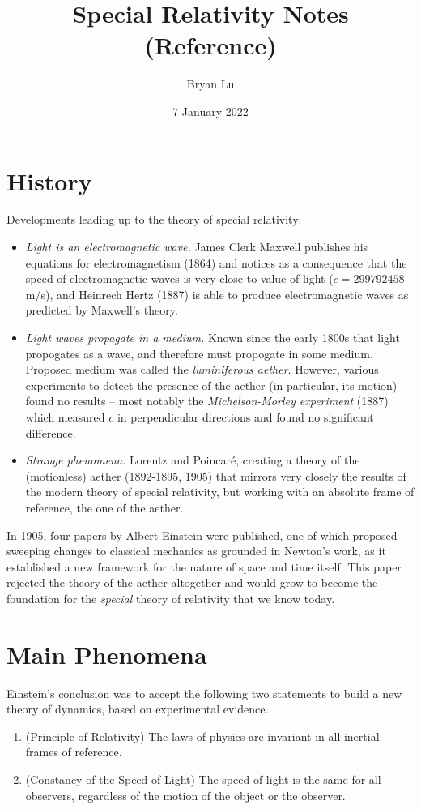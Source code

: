 \documentclass[12pt]{scrartcl}
\title{Special Relativity Notes (Reference)}
\author{Bryan Lu}
\date{7 January 2022} %
\begin{document}
\maketitle

\section{History}
Developments leading up to the theory of special relativity:
\begin{itemize}
	\item \textit{Light is an electromagnetic wave.} James Clerk Maxwell publishes his equations for electromagnetism (1864) and notices as a consequence that the speed of electromagnetic waves is very close to value of light ($c = 299792458$ m/s), and Heinrech Hertz (1887) is able to produce electromagnetic waves as predicted by Maxwell's theory.
	\item \textit{Light waves propagate in a medium.} Known since the early 1800s that light propogates as a wave, and therefore must propogate in some medium. Proposed medium was called the \textit{luminiferous aether}. However, various experiments to detect the presence of the aether (in particular, its motion) found no results -- most notably the \textit{Michelson-Morley experiment} (1887) which measured $c$ in perpendicular directions and found no significant difference.
	\item \textit{Strange phenomena.} Lorentz and Poincar\'e, creating a theory of the (motionless) aether (1892-1895, 1905) that mirrors very closely the results of the modern theory of special relativity, but working with an absolute frame of reference, the one of the aether.
\end{itemize}

In 1905, four papers by Albert Einstein were published, one of which proposed sweeping changes to classical mechanics as grounded in Newton's work, as it established a new framework for the nature of space and time itself. This paper rejected the theory of the aether altogether and would grow to become the foundation for the \textit{special} theory of relativity that we know today.

\section{Main Phenomena}
Einstein's conclusion was to accept the following two statements to build a new theory of dynamics, based on experimental evidence.
\begin{enumerate}
	\item (Principle of Relativity) The laws of physics are invariant in all inertial frames of reference.
	\item (Constancy of the Speed of Light) The speed of light is the same for all observers, regardless of the motion of the object or the observer.
\end{enumerate}
\end{document}
